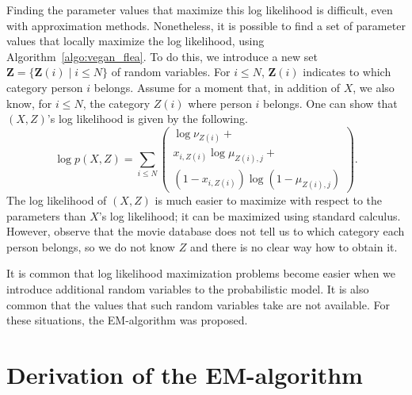 Finding the parameter values that maximize this log likelihood is difficult, even with approximation methods. Nonetheless, it is possible to find a set of parameter values that locally maximize the log likelihood, using Algorithm~\ref{algo:vegan_flea}. To do this, we introduce a new set $\mathbf{Z} = \{\mathbf{Z}(i) \mid i \leq N\}$ of random variables. For $i \leq N$, $\mathbf{Z}(i)$ indicates to which category person $i$ belongs. Assume for a moment that, in addition of $X$, we also know, for $i \leq N$, the category $Z(i)$ where person $i$ belongs. One can show that $(X, Z)$'s log likelihood is given by the following.
%
\begin{equation}
\log p(X, Z) = \sum_{i \leq N} \left( 
\begin{array}{l}
\log \nu_{Z(i)} + \\ 
x_{i,Z(i)}\log {\mu_{Z(i), j}} + \\
\left(1 - x_{i, Z(i)}\right)\log \left(1 - \mu_{Z(i),j}\right)
\end{array}\right).
\label{eq:log_complete_likelihood}
\end{equation}
%
The log likelihood of $(X, Z)$ is much easier to maximize with respect to the parameters than $X$'s log likelihood; it can be maximized using standard calculus. However, observe that the movie database does not tell us to which category each person belongs, so we do not know $Z$ and there is no clear way how to obtain it.

It is common that log likelihood maximization problems become easier when we introduce additional random variables to the probabilistic model. It is also common that the values that such random variables take are not available. For these situations, the EM-algorithm was proposed.

\section{Derivation of the EM-algorithm}
\label{sec:em_algo}

